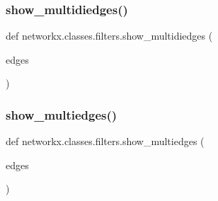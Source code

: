 \subsubsection{\texorpdfstring{show\+\_\+multidiedges()}{show\_multidiedges()}}
{\footnotesize\ttfamily def networkx.\+classes.\+filters.\+show\+\_\+multidiedges (\begin{DoxyParamCaption}\item[{}]{edges }\end{DoxyParamCaption})}

\mbox{\label{namespacenetworkx_1_1classes_1_1filters_ad65d9cd1af7f69cf381888c06085e006}} 
\subsubsection{\texorpdfstring{show\+\_\+multiedges()}{show\_multiedges()}}
{\footnotesize\ttfamily def networkx.\+classes.\+filters.\+show\+\_\+multiedges (\begin{DoxyParamCaption}\item[{}]{edges }\end{DoxyParamCaption})}

